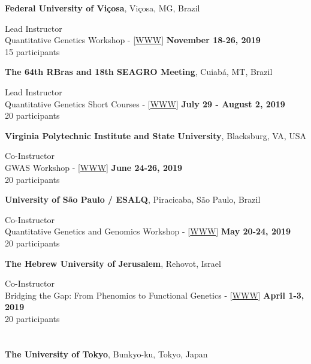 \documentclass[margin,line,10pt]{res}
\begin{document}
\begin{resume}
{\bf Federal University of Vi\c cosa}, Vi\c cosa, MG, Brazil
\vspace{.01pt}

Lead Instructor  \\
Quantitative Genetics Workshop - [\textcolor{blue}{\href{http://morotalab.org/UFV2019/UFV2019.html}{WWW}}]
\hfill {\bf November 18-26, 2019} \\
15 participants


{\bf The 64th RBras and 18th SEAGRO Meeting}, Cuiab{\'a}, MT, Brazil
\vspace{.01pt}

Lead Instructor  \\
    Quantitative Genetics Short Courses - [\textcolor{blue}{\href{http://morotalab.org/RBras2019/RBras2019.html}{WWW}}]
\hfill {\bf  July 29 - August 2, 2019} \\
20 participants 


{\bf Virginia Polytechnic Institute and State University}, Blacksburg, VA, USA
\vspace{.01pt}

Co-Instructor  \\
GWAS Workshop - [\textcolor{blue}{\href{http://morotalab.org/VTGWAS2019/VTGWAS2019.html}{WWW}}]
\hfill {\bf June 24-26, 2019} \\
20 participants 


{\bf University of S\~{a}o Paulo / ESALQ}, Piracicaba, S\~{a}o Paulo, Brazil
\vspace{.01pt}

Co-Instructor  \\
Quantitative Genetics and Genomics Workshop - [\textcolor{blue}{\href{http://morotalab.org/ESALQ2019/ESALQ2019.html}{WWW}}]
\hfill {\bf May 20-24, 2019} \\
20 participants


{\bf The Hebrew University of Jerusalem}, Rehovot, Israel
\vspace{.01pt}

Co-Instructor  \\
Bridging the Gap: From Phenomics to Functional Genetics - [\textcolor{blue}{\href{http://morotalab.org/HUJI2019/HUJI2019.html}{WWW}}]
\hfill {\bf April 1-3, 2019} \\
20 participants

\section{}

{\bf The University of Tokyo}, Bunkyo-ku, Tokyo, Japan
\vspace{.01pt}


\end{resume}
\end{document}
